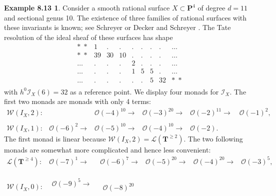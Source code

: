 \documentclass{tran-l}
\newcommand{\I}{\mathcal{I}}
\newcommand{\myP}{\mathbf{P}}
\newcommand{\TT}{\mathbf{T}}
\newcommand{\W}{\mathcal{W}}
\theoremstyle{plain}
\theoremstyle{remark}
\theoremstyle{definition}
\newtheorem*{definition13}{Example 8.13}
\begin{document}
\begin{definition13}
Consider a smooth rational surface 
$X \subset \myP ^{4}$ of degree $d=11$ and sectional
genus 10. The existence of three families of rational surfaces
with these invariants is known; see Schreyer \cite{Sch} or Decker and
Schreyer \cite{DS2}. The Tate resolution of the ideal sheaf of these
surfaces has shape
\begin{equation*}\begin{matrix}*\; *  & 1 & . & . & . & . & . & . & \ldots \\
*\; *  &39 & 30& 10& . & . & . & . &\ldots \\
\ldots & . &.  & . & 2 & . & . & . &\ldots \\
\ldots & . &.  & . & 1 & 5 & 5 & . &\ldots \\
\ldots & . &.  & . & . & . & 5 & 32&*\;* \\
\end{matrix}
\end{equation*}
with $h^{0}\I _{X}(6)=32$ as a reference point.
We display four  monads for $\I _{X}$. The first two monads are monads with
only 4 terms:
\begin{equation*}\begin{matrix}\W (I_{X},2):&&
 \mathcal{O} (-4)^{10}  \to & \mathcal{O} (-3)^{20}  \to & \mathcal{O}
(-2)^{11}  \to &\mathcal{O} (-1)^{2},\\
&&&&&\\
\W (I_{X},1): & \mathcal{O} (-6)^{2}  \to & \mathcal{O} (-5)^{10} \to &
\mathcal{O} (-4)^{10} \to & \mathcal{O} (-2).\qquad \
\end{matrix}
\end{equation*}
The first monad is linear because $\W (I_{X},2)=\mathcal{L}(\TT ^{\ge 2})$.
The two following monads are somewhat more complicated and hence 
less convenient:
\begin{equation*}\begin{matrix}\mathcal{L}(\TT ^{\ge 4}): & \mathcal{O} (-7)^{1} 
\to &\mathcal{O} (-6)^{7} \to &\mathcal{O} (-5)^{20} \to &\mathcal{O} (-4)^{20}
\to &\mathcal{O} (-3)^{5},\\
&&&&&\\
&&&&&\\
\W (I_{X},0):&  \begin{matrix}\mathcal{O} (-9)^{5} \to \\\\\\\end{matrix}
&\begin{matrix}\mathcal{O} (-8)^{20}

\end{matrix}
\end{matrix}
\end{equation*}
\end{definition13}
\end{document}

